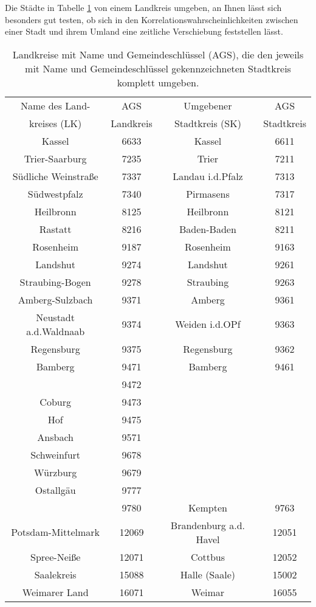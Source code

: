 Die Städte in Tabelle \ref{tab:landkreise_um_städte} von einem Landkreis umgeben, an Ihnen lässt sich besonders gut testen, ob sich in den Korrelationswahrscheinlichkeiten zwischen einer Stadt und ihrem Umland eine zeitliche Verschiebung feststellen lässt.
\begin{table}[H]
    \centering
    \begin{tabular}{c|c|c|c}
    Name des Land-&AGS &Umgebener  &AGS\\
    kreises (LK)  &Landkreis&Stadtkreis (SK)&Stadtkreis\\
    \hline
Kassel & 6633 & Kassel & 6611 \\\hdashline
Trier-Saarburg & 7235 & Trier & 7211 \\\hdashline
Südliche Weinstraße & 7337 & Landau i.d.Pfalz & 7313 \\\hdashline
Südwestpfalz & 7340 & Pirmasens & 7317 \\\hdashline
Heilbronn & 8125 & Heilbronn & 8121 \\\hdashline
Rastatt & 8216 & Baden-Baden & 8211 \\\hdashline
Rosenheim & 9187 & Rosenheim & 9163 \\\hdashline
Landshut & 9274 & Landshut & 9261 \\\hdashline
Straubing-Bogen & 9278 & Straubing & 9263 \\\hdashline
Amberg-Sulzbach & 9371 & Amberg & 9361 \\\hdashline
Neustadt a.d.Waldnaab & 9374 & Weiden i.d.OPf & 9363 \\\hdashline
Regensburg & 9375 & Regensburg & 9362 \\\hdashline
Bamberg & 9471 & Bamberg & 9461 \\\hdashline
\begin{comment}
Bayreuth & 9472 &  &  \\\hdashline
Coburg & 9473 &  &  \\\hdashline
Hof & 9475 &  &  \\\hdashline
Ansbach & 9571 &  &  \\\hdashline
Schweinfurt & 9678 &  &  \\\hdashline
Würzburg & 9679 &  &  \\\hdashline
Ostallgäu & 9777 &  &  \\\hdashline
\end{comment}
Oberallgäu & 9780 & Kempten & 9763 \\\hdashline
Potsdam-Mittelmark & 12069 & Brandenburg a.d. Havel & 12051 \\\hdashline
Spree-Neiße & 12071 & Cottbus & 12052 \\\hdashline
Saalekreis & 15088 & Halle (Saale) & 15002 \\\hdashline
Weimarer Land & 16071 & Weimar & 16055
    \end{tabular}
    \caption{Landkreise mit Name und Gemeindeschlüssel (AGS), die den jeweils mit Name und Gemeindeschlüssel gekennzeichneten Stadtkreis komplett umgeben.}
    \label{tab:landkreise_um_städte}
\end{table}

